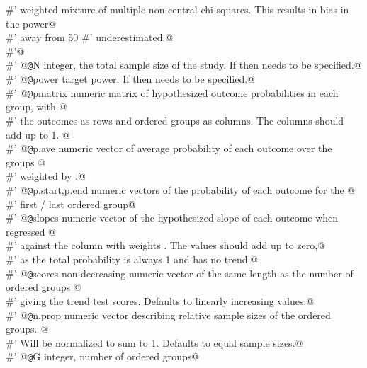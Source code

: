 \documentclass[reqno]{amsart}
\begin{document}
\begin{flushleft}
\begin{list}{}{}
\mbox{}\verb@#' weighted mixture of multiple non-central chi-squares. This results in bias in the power@\\
\mbox{}\verb@#' away from 50% - values above it are somewhat overestimated, while values under it are@\\
\mbox{}\verb@#' underestimated.@\\
\mbox{}\verb@#'@\\
\mbox{}\verb@#' @{\tt @}\verb@param N integer, the total sample size of the study. If  then  needs to be specified.@\\
\mbox{}\verb@#' @{\tt @}\verb@param power target power. If  then  needs to be specified.@\\
\mbox{}\verb@#' @{\tt @}\verb@param pmatrix numeric matrix of hypothesized outcome probabilities in each group,  with @\\
\mbox{}\verb@#' the outcomes as rows and ordered groups as columns. The columns should add up to 1. @\\
\mbox{}\verb@#' @{\tt @}\verb@param p.ave numeric vector of average probability of each outcome over the groups  @\\
\mbox{}\verb@#' weighted by .@\\
\mbox{}\verb@#' @{\tt @}\verb@param p.start,p.end numeric vectors of the probability of each outcome for the  @\\
\mbox{}\verb@#' first / last ordered group@\\
\mbox{}\verb@#' @{\tt @}\verb@param slopes numeric vector of the hypothesized slope of each outcome when regressed  @\\
\mbox{}\verb@#' against the column  with weights . The values should add up to zero,@\\
\mbox{}\verb@#' as the total probability is always 1 and has no trend.@\\
\mbox{}\verb@#' @{\tt @}\verb@param scores non-decreasing numeric vector of the same length as the number of ordered groups  @\\
\mbox{}\verb@#' giving the trend test scores. Defaults to linearly increasing values.@\\
\mbox{}\verb@#' @{\tt @}\verb@param n.prop numeric vector describing relative sample sizes of the ordered groups.  @\\
\mbox{}\verb@#' Will be normalized to sum to 1. Defaults to equal sample sizes.@\\
\mbox{}\verb@#' @{\tt @}\verb@param G integer, number of ordered groups@\\

\end{list}
\end{flushleft}
\end{document}
